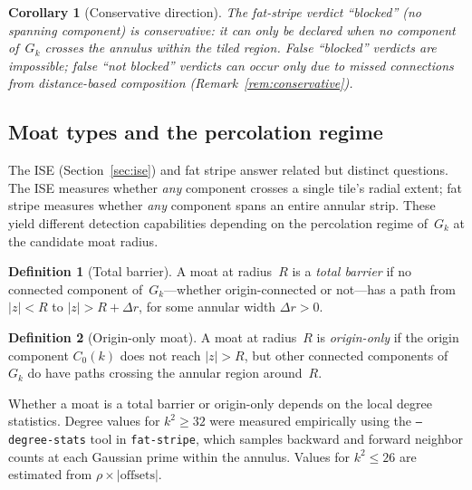 \documentclass[11pt,a4paper]{article}
\newcommand{\Gk}{G_k}
\theoremstyle{definition}
\newtheorem{definition}{Definition}[section]
\theoremstyle{plain}
\newtheorem{corollary}[theorem]{Corollary}
\theoremstyle{remark}
\begin{document}
\begin{corollary}[Conservative direction]\label{cor:fs-conservative}
The fat-stripe verdict ``blocked'' (no spanning component) is conservative: it can only be declared when no component of~$\Gk$ crosses the annulus within the tiled region.  False ``blocked'' verdicts are impossible; false ``not blocked'' verdicts can occur only due to missed connections from distance-based composition (Remark~\ref{rem:conservative}).
\end{corollary}

\subsection{Moat types and the percolation regime}

The ISE (Section~\ref{sec:ise}) and fat stripe answer related but distinct questions.  The ISE measures whether \emph{any} component crosses a single tile's radial extent; fat stripe measures whether \emph{any} component spans an entire annular strip.  These yield different detection capabilities depending on the percolation regime of~$\Gk$ at the candidate moat radius.

\begin{definition}[Total barrier]\label{def:total-barrier}
A moat at radius~$R$ is a \emph{total barrier} if no connected component of~$\Gk$---whether origin-connected or not---has a path from $|z| < R$ to $|z| > R + \Delta r$, for some annular width $\Delta r > 0$.
\end{definition}

\begin{definition}[Origin-only moat]\label{def:origin-only}
A moat at radius~$R$ is \emph{origin-only} if the origin component $C_0(k)$ does not reach $|z| > R$, but other connected components of~$\Gk$ do have paths crossing the annular region around~$R$.
\end{definition}

Whether a moat is a total barrier or origin-only depends on the local degree statistics.  Degree values for $k^2 \ge 32$ were measured empirically using the \texttt{--degree-stats} tool in \texttt{fat-stripe}, which samples backward and forward neighbor counts at each Gaussian prime within the annulus.  Values for $k^2 \le 26$ are estimated from $\rho \times |\text{offsets}|$.
\end{document}

